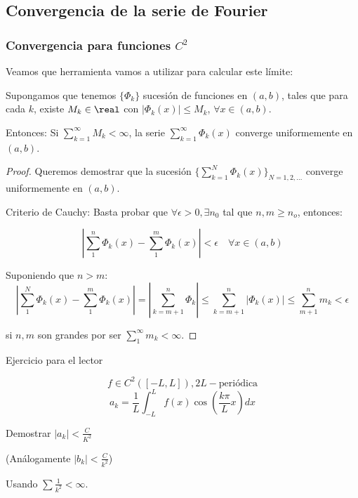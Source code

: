 	\subsection{Convergencia de la serie de Fourier}

		\subsubsection{Convergencia para funciones $C^2$}

		Veamos que herramienta vamos a utilizar para calcular este límite:

		\begin{defn}\label{defn:criterio_Weierstrass} Supongamos que tenemos $\{\Phi_k\}$ sucesión de funciones en $(a,b)$, tales que para cada $k$, existe $M_k \in \real$ con $|\Phi_k(x)| \leq M_k$, $\forall x \in (a,b)$.

			Entonces: Si $\sum\limits_{k=1}^{\infty} M_k < \infty$, la serie $\sum\limits_{k=1}^{\infty} \Phi_k(x) $ converge uniformemente en $(a,b)$.


			\begin{proof}
				Queremos demostrar que la sucesión $\{\sum\limits_{k=1}^{N} \Phi_k(x)\}_{N=1,2,…} $ converge uniformemente en $(a,b)$.

				Criterio de Cauchy: Basta probar que $\forall \epsilon > 0, \exists n_0 $ tal que $n,m \geq n_o $, entonces:

				\[ | \sum^n_1 \Phi_k(x) - \sum^m_1 \Phi_k(x) | < \epsilon \quad \forall x \in (a,b) \]

				Suponiendo que $n > m$:
				\[| \sum^{N}_1 \Phi_k (x) - \sum^{m}_1 \Phi_k (x) | = | \sum^n_{k=m+1} \Phi_k | \leq \sum^n_{k=m+1} | \Phi_k (x) | \leq \sum_{m+1}^n m_k < \epsilon \]

				si $n,m$ son grandes por ser  $\sum\limits_{1}^{\infty} m_k < \infty $.

			\end{proof}
		\end{defn}

		\begin{example}{Ejercicio para el lector}

			\[ f \in C^2 ([-L,L]), 2L-\text{periódica}\]
			\[ a_k = \frac{1}{L} \int^{L}_{-L} f(x) \cos \left( \frac{k \pi}{L} x \right) dx \]

			Demostrar $|a_k| < \frac{C}{K^2}$

			(Análogamente $|b_k| < \frac{C}{k^2}$)

			Usando $\sum \frac{1}{k^2} < \infty$.
		\end{example}

